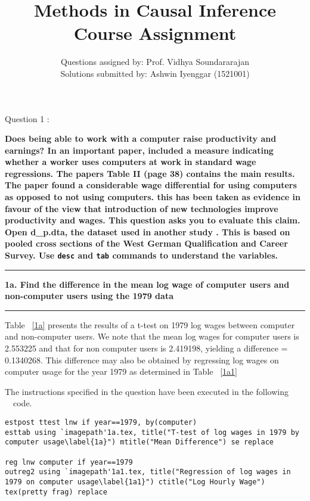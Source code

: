 \documentclass[12pt]{article}
\newcommand\question[1]{\vspace{1em}\hrule\vspace{1em}\textbf{#1}\vspace{1em}\hrule\vspace{1em}}
\begin{document}
\title{Methods in Causal Inference Course Assignment}
\author{Questions assigned by: Prof. Vidhya Soundararajan\\ Solutions submitted by: Ashwin Iyenggar  (1521001)} 


\maketitle
\thispagestyle{empty}

\setlength\parindent{0pt}

\begin{center}\LARGE{Question 1 : \cite{Dinardo1997}}\end{center}
\textbf{Does being able to work with a computer raise productivity and earnings? In an important paper, \cite{Krueger1993} included a measure indicating whether a worker uses computers at work in standard wage regressions. The paper\textquotesingle s Table II (page 38) contains the main results. The paper found a considerable wage differential for using computers as opposed to not using computers. this has been taken as evidence in favour of the view that introduction of new technologies improve productivity and wages. This question asks you to evaluate this claim. Open d\_p.dta, the dataset used in another study \citep{Dinardo1997}. This is based on pooled cross sections of the West German Qualification and Career Survey. Use \texttt{desc} and \texttt{tab} commands to understand the variables.}
\question{1a. Find the difference in the mean log wage of computer users and non-computer users using the 1979 data}

Table ~\ref{1a} presents the results of a t-test on 1979 log wages between computer and non-computer users. We note that the mean log wages for computer users is 2.553225 and that for non computer users is 2.419198, yielding a difference = 0.1340268. This difference may also be obtained by regressing log wages on computer usage for the year 1979 as determined in Table ~\ref{1a1}

The instructions specified in the question have been executed in the following \stata \  \ code.\\
\begin{lstlisting}
estpost ttest lnw if year==1979, by(computer)
esttab using `imagepath'1a.tex, title("T-test of log wages in 1979 by computer usage\label{1a}") mtitle("Mean Difference") se replace

reg lnw computer if year==1979
outreg2 using `imagepath'1a1.tex, title("Regression of log wages in 1979 on computer usage\label{1a1}") ctitle("Log Hourly Wage") tex(pretty frag) replace
\end{lstlisting}
\end{document}
